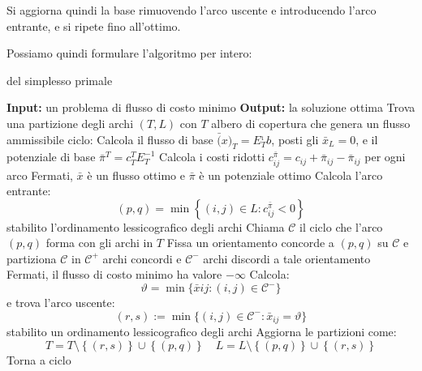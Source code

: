 \documentclass[a4paper,11pt]{article}
\begin{document}
Si aggiorna quindi la base rimuovendo l'arco uscente e introducendo l'arco entrante, e si ripete fino all'ottimo.

Possiamo quindi formulare l'algoritmo per intero:

\begin{algorithm}[H]
\caption{del simplesso primale}
\begin{algorithmic}
	\STATE \textbf{Input:} un problema di flusso di costo minimo 
	\STATE \textbf{Output:} la soluzione ottima 
	\STATE Trova una partizione degli archi $(T,L)$ con $T$ albero di copertura che genera un flusso ammissibile
	\STATE \textsf{ciclo:}
	\STATE Calcola il flusso di base $\bar(x)_T = E_T^{_1} b$, posti gli $\bar{x}_L = 0$, e il potenziale di base $\bar{\pi}^T = c_T^T E_T^{-1}$
	\STATE Calcola i costi ridotti $c_{ij}^{\bar{\pi}} = c_{ij} + \bar{\pi}_{ij} - \bar{\pi}_{ij}$ per ogni arco
	\STATE Fermati, $\bar{x}$ è un flusso ottimo e $\bar{\pi}$ è un potenziale ottimo
\ELSE
		\STATE Calcola l'arco entrante: 
		$$
		(p, q) = \min \left\{ (i, j) \in L : c_{ij}^{\bar{\pi}} < 0 \right\}
		$$
		stabilito l'ordinamento lessicografico degli archi
		\STATE Chiama $\mathcal{C}$ il ciclo che l'arco $(p, q)$ forma con gli archi in $T$
		\STATE Fissa un orientamento concorde a $(p,q)$ su $\mathcal{C}$ e partiziona $\mathcal{C}$ in $\mathcal{C^+}$ archi concordi e $\mathcal{C^-}$ archi discordi a tale orientamento
	\ENDIF
		\STATE Fermati, il flusso di costo minimo ha valore $-\infty$ 
	\ELSE
		\STATE Calcola:
		$$
		\vartheta = \min\{ \bar{x}{ij} : (i, j) \in \mathcal{C}^- \}
		$$
		e trova l'arco uscente: 
		$$ 
		(r, s) := \min\{ (i, j) \in \mathcal{C}^- : \bar{x}_{ij} = \vartheta \} 
		$$
		stabilito un ordinamento lessicografico degli archi
	\ENDIF
	\STATE Aggiorna le partizioni come:
	$$
	T = T \setminus \left\{ (r,s) \right\} \cup \left\{ (p, q) \right\} \quad L = L \setminus \left\{ (p, q) \right\} \cup \left\{ (r, s) \right\}
	$$
	\STATE Torna a \textsf{ciclo}
\end{algorithmic}
\end{algorithm}
\end{document}
